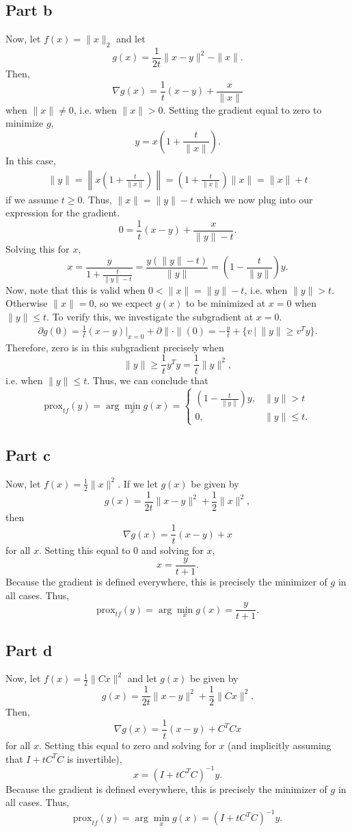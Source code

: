 \documentclass{article}
\newcommand{\prox}{\mathrm{prox}}
\begin{document}
\subsection{Part b}
Now, let $f(x) = \|x\|_2$ and let 
\[
g(x)=\frac{1}{2t}\|x-y\|^2-\|x\|.
\]
Then, 
\[
\nabla g(x)=\frac{1}{t}(x-y)+\frac{x}{\|x\|}
\]
when $\|x\|\neq0$, i.e. when $\|x\|>0$. Setting the gradient equal to zero to minimize $g$, 
\[
y=x\left(1+\frac{t}{\|x\|}\right).
\]
In this case,
\begin{align*}
\|y\|=\left\|x\left(1+\frac{t}{\|x\|}\right)\right\|=\left(1+\frac{t}{\|x\|}\right)\|x\|=\|x\|+t
\end{align*}
if we assume $t\geq0$. Thus, $\|x\|=\|y\|-t$ which we now plug into our expression for the gradient.
\[
0=\frac{1}{t}(x-y)+\frac{x}{\|y\|-t}.
\]
Solving this for $x$, 
\[
x=\frac{y}{1+\frac{t}{\|y\|-t}}=\frac{y(\|y\|-t)}{\|y\|}=\left(1-\frac{t}{\|y\|}\right)y.
\]
Now, note that this is valid when $0<\|x\|=\|y\|-t$, i.e. when $\|y\|>t$. Otherwise $\|x\|=0$, so we expect $g(x)$ to be minimized at $x=0$ when $\|y\|\leq t$. To verify this, we investigate the subgradient at $x=0$.
\begin{align*}
\partial g(0)= \frac{1}{t}(x-y)\bigg|_{x=0}+\partial\|\cdot\|(0)=-\frac{y}{t}+\{v~|~\|y\|\geq v^Ty\}.
\end{align*}
Therefore, zero is in this subgradient precisely when
\[
\|y\|\geq\frac{1}{t}y^Ty=\frac{1}{t}\|y\|^2,
\]
i.e. when $\|y\|\leq t$. Thus, we can conclude that
\[
\prox_{tf}(y)=\arg\min_x g(x)=\begin{cases}
\left(1-\frac{t}{\|y\|}\right)y, &\|y\|>t\\
0, &\|y\|\leq t.
\end{cases}
\]

\subsection{Part c}
Now, let $f(x) = \frac{1}{2}\|x\|^2$. If we let $g(x)$ be given by 
\[
g(x)=\frac{1}{2t}\|x-y\|^2+\frac{1}{2}\|x\|^2,
\]
then 
\[
\nabla g(x)=\frac{1}{t}(x-y) +x
\]
for all $x$. Setting this equal to $0$ and solving for $x$,
\[
x=\frac{y}{t+1}.
\]
Because the gradient is defined everywhere, this is precisely the minimizer of $g$ in all cases. Thus,
\[
\prox_{tf}(y)=\arg\min_x g(x)=\frac{y}{t+1}.
\]

\subsection{Part d}
Now, let $f(x) = \frac{1}{2}\|Cx\|^2$ and let $g(x)$ be given by 
\[
g(x)=\frac{1}{2t}\|x-y\|^2+\frac{1}{2}\|Cx\|^2.
\]
Then, 
\[
\nabla g(x)=\frac{1}{t}(x-y)+C^TCx
\]
for all $x$. Setting this equal to zero and solving for $x$ (and implicitly assuming that $I+tC^TC$ is invertible), 
\[
x=(I+tC^TC)^{-1}y.
\]
Because the gradient is defined everywhere, this is precisely the minimizer of $g$ in all cases. Thus,
\[
\prox_{tf}(y)=\arg\min_x g(x)=(I+tC^TC)^{-1}y.
\]
\end{document}
